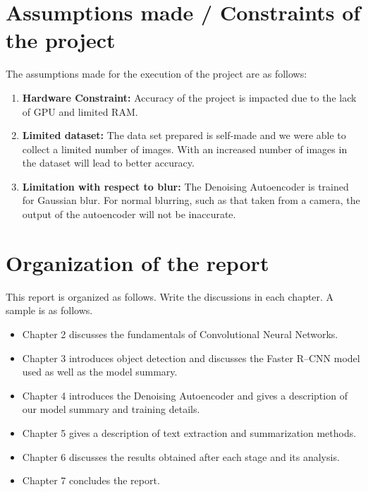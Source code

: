 \section[Assumptions made / Constraints of the project]{\textbf{Assumptions made / Constraints of the project}}

The assumptions made for the execution of the project are as follows: 
\begin{enumerate}
    \item \textbf{Hardware Constraint: }Accuracy of the project is impacted due to the lack of GPU and limited RAM.
    \item \textbf{Limited dataset: }The data set prepared is self-made and we were able to collect a limited number of images. With an increased number of images in the dataset will lead to better accuracy.
    \item \textbf{Limitation with respect to blur: }The Denoising Autoencoder is trained for Gaussian blur. For normal blurring, such as that taken from a camera, the output of the autoencoder will not be inaccurate.
\end{enumerate}

\section[Organization of the report]{\textbf{Organization of the report}}

This report is organized as follows. Write the discussions in each chapter. A sample is as follows.
\begin{itemize}
\item Chapter 2 discusses the fundamentals of Convolutional Neural Networks.
\item Chapter 3 introduces object detection and discusses the Faster R–CNN model used as well as the model summary.
\item Chapter 4 introduces the Denoising Autoencoder and gives a description of our model summary and training details.
\item Chapter 5 gives a description of text extraction and summarization methods.
\item Chapter 6 discusses the results obtained after each stage and its analysis.
\item Chapter 7 concludes the report.
\end{itemize}
